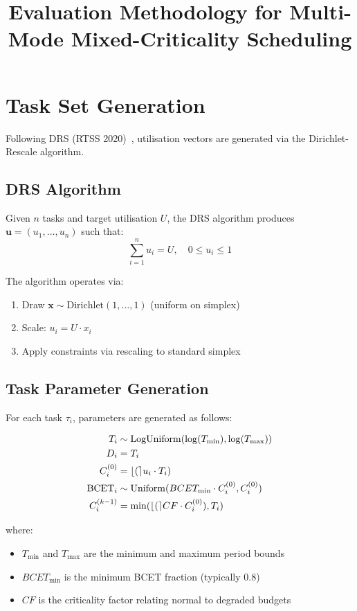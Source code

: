 \documentclass{article}
\title{Evaluation Methodology for Multi-Mode Mixed-Criticality Scheduling}
\author{}
\date{}
\begin{document}
\maketitle

\section{Task Set Generation}

Following DRS (RTSS 2020)~\cite{1a02ee59d96a4af497808eeb685b574c}, utilisation vectors are generated via the Dirichlet-Rescale algorithm.

\subsection{DRS Algorithm}

Given $n$ tasks and target utilisation $U$, the DRS algorithm produces $\mathbf{u} = (u_1, \dots, u_n)$ such that:
\[
\sum_{i=1}^n u_i = U, \quad 0 \leq u_i \leq 1
\]

The algorithm operates via:
\begin{enumerate}
    \item Draw $\mathbf{x} \sim \mathrm{Dirichlet}(1, \dots, 1)$ (uniform on simplex)
    \item Scale: $u_i = U \cdot x_i$
    \item Apply constraints via rescaling to standard simplex
\end{enumerate}

\subsection{Task Parameter Generation}

For each task $\tau_i$, parameters are generated as follows:

\begin{align*}
T_i &\sim \mathrm{LogUniform}(\log(T_{\min}), \log(T_{\max})) \\
D_i &= T_i \\
C_i^{(0)} &= \lfloor ( \rceil u_i \cdot T_i) \\
\mathrm{BCET}_i &\sim \mathrm{Uniform}(BCET_{\mathrm{min}} \cdot C_i^{(0)}, C_i^{(0)}) \\
C_i^{(k-1)} &= \min(\lfloor ( \rceil CF \cdot C_i^{(0)}), T_i)
\end{align*}

where:
\begin{itemize}
    \item $T_{\min}$ and $T_{\max}$ are the minimum and maximum period bounds
    \item $BCET_{\mathrm{min}}$ is the minimum BCET fraction (typically $0.8$)
    \item $CF$ is the criticality factor relating normal to degraded budgets
\end{itemize}
\end{document}
